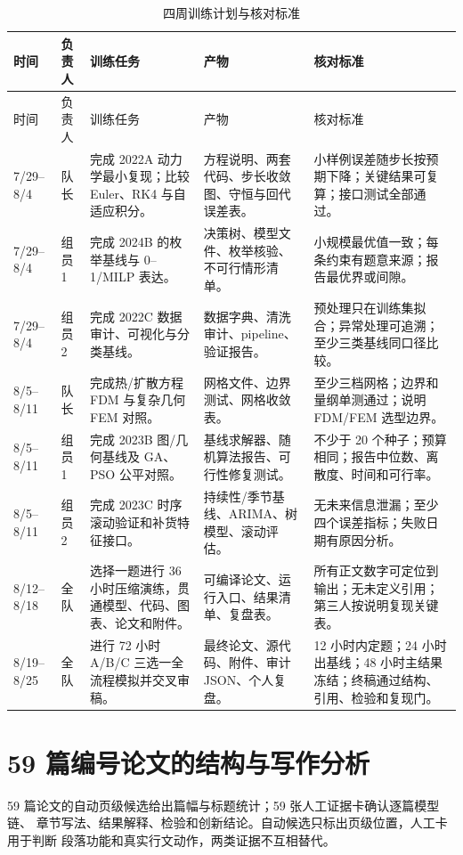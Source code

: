 \documentclass[UTF8,a4paper,12pt]{ctexart}
\begin{document}
\begin{longtable}{p{1.4cm}p{1.55cm}p{3.1cm}p{4.6cm}p{3.4cm}}
\caption{四周训练计划与核对标准}\label{tab:four-weeks}\\
\toprule
时间 & 负责人 & 训练任务 & 产物 & 核对标准\\
\midrule
\endfirsthead
\toprule
时间 & 负责人 & 训练任务 & 产物 & 核对标准\\
\midrule
\endhead
7/29--8/4 & 队长 & 完成 2022A 动力学最小复现；比较 Euler、RK4 与自适应积分。 & 方程说明、两套代码、步长收敛图、守恒与回代误差表。 & 小样例误差随步长按预期下降；关键结果可复算；接口测试全部通过。\\
7/29--8/4 & 组员1 & 完成 2024B 的枚举基线与 0--1/MILP 表达。 & 决策树、模型文件、枚举核验、不可行情形清单。 & 小规模最优值一致；每条约束有题意来源；报告最优界或间隙。\\
7/29--8/4 & 组员2 & 完成 2022C 数据审计、可视化与分类基线。 & 数据字典、清洗审计、pipeline、验证报告。 & 预处理只在训练集拟合；异常处理可追溯；至少三类基线同口径比较。\\
8/5--8/11 & 队长 & 完成热/扩散方程 FDM 与复杂几何 FEM 对照。 & 网格文件、边界测试、网格收敛表。 & 至少三档网格；边界和量纲单测通过；说明 FDM/FEM 选型边界。\\
8/5--8/11 & 组员1 & 完成 2023B 图/几何基线及 GA、PSO 公平对照。 & 基线求解器、随机算法报告、可行性修复测试。 & 不少于 20 个种子；预算相同；报告中位数、离散度、时间和可行率。\\
8/5--8/11 & 组员2 & 完成 2023C 时序滚动验证和补货特征接口。 & 持续性/季节基线、ARIMA、树模型、滚动评估。 & 无未来信息泄漏；至少四个误差指标；失败日期有原因分析。\\
8/12--8/18 & 全队 & 选择一题进行 36 小时压缩演练，贯通模型、代码、图表、论文和附件。 & 可编译论文、运行入口、结果清单、复盘表。 & 所有正文数字可定位到输出；无未定义引用；第三人按说明复现关键表。\\
8/19--8/25 & 全队 & 进行 72 小时 A/B/C 三选一全流程模拟并交叉审稿。 & 最终论文、源代码、附件、审计 JSON、个人复盘。 & 12 小时内定题；24 小时出基线；48 小时主结果冻结；终稿通过结构、引用、检验和复现门。\\
\bottomrule
\end{longtable}

\section{59 篇编号论文的结构与写作分析}

59 篇论文的自动页级候选给出篇幅与标题统计；59 张人工证据卡确认逐篇模型链、
章节写法、结果解释、检验和创新结论。自动候选只标出页级位置，人工卡用于判断
段落功能和真实行文动作，两类证据不互相替代。
\end{document}
